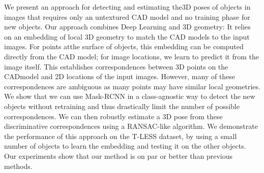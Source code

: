We  present  an  approach  for  detecting  and  estimating  the3D  poses  of  objects  in  images  that  requires  only  an  untextured  CAD model  and  no  training  phase  for  new  objects.  Our  approach  combines Deep Learning and 3D geometry: It relies on an embedding of local 3D geometry to match the CAD models to the input images. For points atthe surface of objects, this embedding can be computed directly from the CAD model; for image locations, we learn to predict it from the image itself. This establishes correspondences between 3D points on the CADmodel  and  2D  locations  of  the  input  images.  However,  many  of  these correspondences are ambiguous as many points may have similar local geometries. We show that we can use Mask-RCNN in a class-agnostic way to detect the new objects without retraining and thus drastically limit the number of possible correspondences. We can then robustly estimate a 3D pose from these discriminative correspondences using a RANSAC-like  algorithm.  We  demonstrate  the  performance  of  this  approach  on the  T-LESS  dataset,  by  using  a  small  number  of  objects  to  learn  the embedding  and  testing  it  on  the  other  objects.  Our  experiments  show that our method is on par or better than previous methods.